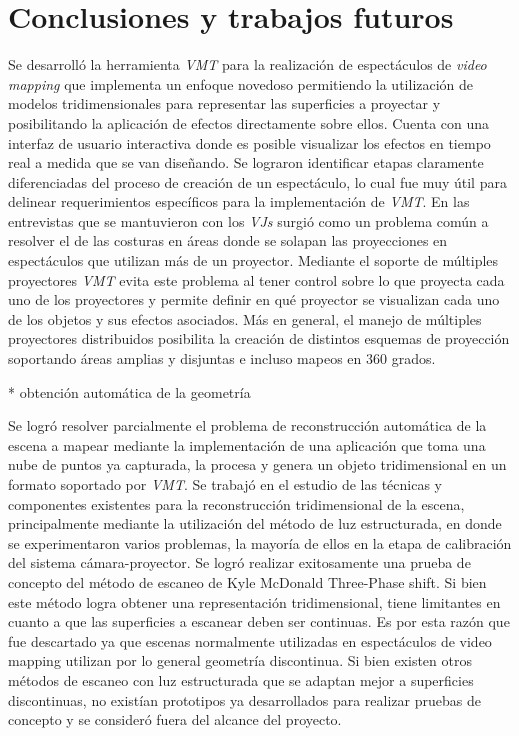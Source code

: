 ﻿\chapter{Conclusiones y trabajos futuros}

Se desarrolló la herramienta \emph{VMT} para la realización de espectáculos de \emph{video mapping} que implementa un enfoque novedoso permitiendo la utilización de modelos tridimensionales para representar las superficies a proyectar y posibilitando la aplicación de efectos directamente sobre ellos. Cuenta con una interfaz de usuario interactiva donde es posible visualizar los efectos en tiempo real a medida que se van diseñando.
Se lograron identificar etapas claramente diferenciadas del proceso de creación de un espectáculo, lo cual fue muy útil para delinear requerimientos específicos para la implementación de \emph{VMT}. 
En las entrevistas que se mantuvieron con los \emph{VJs} surgió como un problema común a resolver el de las costuras en áreas donde se solapan las proyecciones en espectáculos que utilizan más de un proyector. Mediante el soporte de múltiples proyectores \emph{VMT} evita este problema al tener control sobre lo que proyecta cada uno de los proyectores y permite definir en qué proyector se visualizan cada uno de los objetos y sus efectos asociados. Más en general, el manejo de múltiples proyectores distribuidos posibilita la creación de distintos esquemas de proyección soportando áreas amplias y disjuntas e incluso mapeos en 360 grados.

* obtención automática de la geometría

Se logró resolver parcialmente el problema de reconstrucción automática de la escena a mapear mediante la implementación de una aplicación que toma una nube de puntos ya capturada, la procesa y genera un objeto tridimensional en un formato soportado por \emph{VMT}.
Se trabajó en el estudio de las técnicas y componentes existentes para la reconstrucción tridimensional de la escena, principalmente mediante la utilización del método de luz estructurada, en donde se experimentaron varios problemas, la mayoría de ellos en la etapa de calibración del sistema cámara-proyector. 
Se logró realizar exitosamente una prueba de concepto del método de escaneo de Kyle McDonald  Three-Phase shift.
Si bien este método logra obtener una representación tridimensional, tiene limitantes en cuanto a que las superficies a escanear deben ser continuas. Es por esta razón que fue descartado ya que escenas normalmente utilizadas en espectáculos de video mapping utilizan por lo general geometría discontinua.
Si bien existen otros métodos de escaneo con luz estructurada que se adaptan mejor a superficies discontinuas, no existían prototipos ya desarrollados para realizar pruebas de concepto y se consideró fuera del alcance del proyecto.

